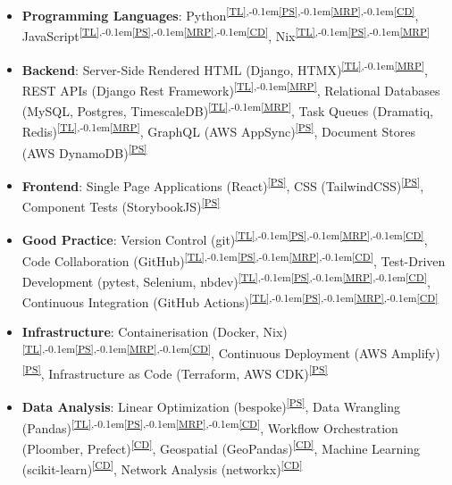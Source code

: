 \documentclass[a4paper,11pt]{article}
\newcommand{\skillref}[1]{\textsuperscript{\ref{#1}}}
\newcommand{\ssep}{\textsuperscript{,\kern-0.1em}}
\begin{document}
\begin{minipage}[t]{0.97\textwidth}
  \begin{itemize}[nosep, leftmargin=2em, itemsep=4pt]

      \item \textbf{Programming Languages}:
      Python\skillref{TL}\ssep\skillref{PS}\ssep\skillref{MRP}\ssep\skillref{CD},
      JavaScript\skillref{TL}\ssep\skillref{PS}\ssep\skillref{MRP}\ssep\skillref{CD},
      Nix\skillref{TL}\ssep\skillref{PS}\ssep\skillref{MRP}

      \item \textbf{Backend}:
      Server-Side Rendered HTML (Django, HTMX)\skillref{TL}\ssep\skillref{MRP},
      REST APIs (Django Rest Framework)\skillref{TL}\ssep\skillref{MRP},
      Relational Databases (MySQL, Postgres, TimescaleDB)\skillref{TL}\ssep\skillref{MRP},
      Task Queues (Dramatiq, Redis)\skillref{TL}\ssep\skillref{MRP},
      GraphQL (AWS AppSync)\skillref{PS},
      Document Stores (AWS DynamoDB)\skillref{PS}

      \item \textbf{Frontend}:
      Single Page Applications (React)\skillref{PS},
      CSS (TailwindCSS)\skillref{PS},
      Component Tests (StorybookJS)\skillref{PS}

      \item \textbf{Good Practice}:
      Version Control (git)\skillref{TL}\ssep\skillref{PS}\ssep\skillref{MRP}\ssep\skillref{CD},
      Code Collaboration (GitHub)\skillref{TL}\ssep\skillref{PS}\ssep\skillref{MRP}\ssep\skillref{CD},
      Test-Driven Development (pytest, Selenium, nbdev)\skillref{TL}\ssep\skillref{PS}\ssep\skillref{MRP}\ssep\skillref{CD},
      Continuous Integration (GitHub Actions)\skillref{TL}\ssep\skillref{PS}\ssep\skillref{MRP}\ssep\skillref{CD}

      \item \textbf{Infrastructure}:
      Containerisation (Docker, Nix)\skillref{TL}\ssep\skillref{PS}\ssep\skillref{MRP}\ssep\skillref{CD},
      Continuous Deployment (AWS Amplify)\skillref{PS},
      Infrastructure as Code (Terraform, AWS CDK)\skillref{PS}

      \item \textbf{Data Analysis}:
      Linear Optimization (bespoke)\skillref{PS},
      Data Wrangling (Pandas)\skillref{TL}\ssep\skillref{PS}\ssep\skillref{MRP}\ssep\skillref{CD},
      Workflow Orchestration (Ploomber, Prefect)\skillref{CD},
      Geospatial (GeoPandas)\skillref{CD},
      Machine Learning (scikit-learn)\skillref{CD},
      Network Analysis (networkx)\skillref{CD}

  \end{itemize}
\end{minipage}

\end{document}
